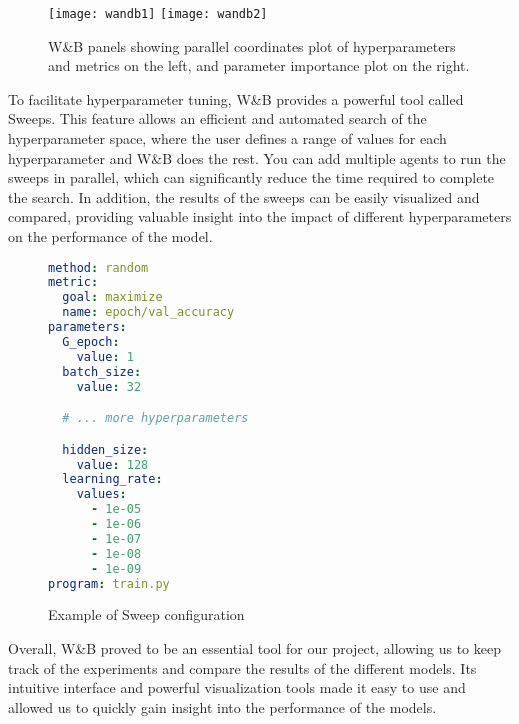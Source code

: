 \begin{figure}[H]
  \centering
  \texttt{[image: wandb1]}
  \texttt{[image: wandb2]}
  \caption{W\&B panels showing parallel coordinates plot of hyperparameters and metrics on the left, and parameter importance plot on the right.}
\end{figure}


To facilitate hyperparameter tuning, W\&B provides a powerful tool called Sweeps.
This feature allows an efficient and automated search of the hyperparameter space, where the user defines a range of values for each hyperparameter and W\&B does the rest.
You can add multiple agents to run the sweeps in parallel, which can significantly reduce the time required to complete the search.
In addition, the results of the sweeps can be easily visualized and compared, providing valuable insight into the impact of different hyperparameters on the performance of the model.

\begin{figure}[H]
\begin{lstlisting}[language=yaml]
method: random
metric:
  goal: maximize
  name: epoch/val_accuracy
parameters:
  G_epoch:
    value: 1
  batch_size:
    value: 32

  # ... more hyperparameters

  hidden_size:
    value: 128
  learning_rate:
    values:
      - 1e-05
      - 1e-06
      - 1e-07
      - 1e-08
      - 1e-09
program: train.py
\end{lstlisting}
\caption{Example of Sweep configuration}
\end{figure}

Overall, W\&B proved to be an essential tool for our project, allowing us to keep track of the experiments and compare the results of the different models. 
Its intuitive interface and powerful visualization tools made it easy to use and allowed us to quickly gain insight into the performance of the models.




